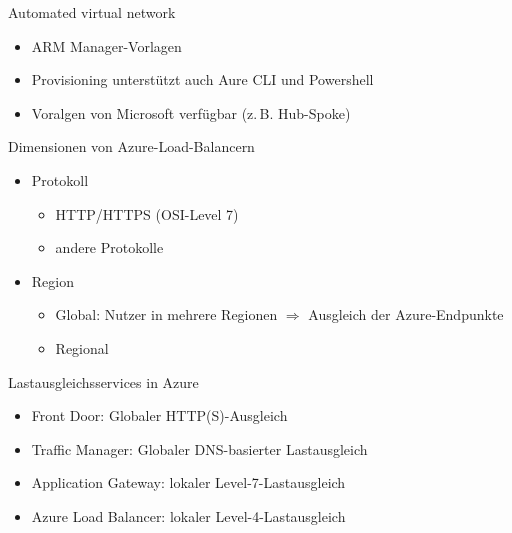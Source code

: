 
\begin{flashcard}[]{Automated virtual network}
  \begin{itemize}
    \item ARM Manager-Vorlagen
    \item Provisioning unterstützt auch Aure CLI und Powershell
    \item Voralgen von Microsoft verfügbar (z.\,B. Hub-Spoke)
  \end{itemize}
\end{flashcard}


\begin{flashcard}[]{Dimensionen von Azure-Load-Balancern}
  \begin{itemize}
    \item Protokoll
      \begin{itemize}
        \item HTTP/HTTPS (OSI-Level 7)
        \item andere Protokolle
      \end{itemize}
    \item Region
      \begin{itemize}
        \item Global: Nutzer in mehrere Regionen\newline
          $\Rightarrow$ Ausgleich der Azure-Endpunkte
        \item Regional
      \end{itemize}
  \end{itemize}
\end{flashcard}

\begin{flashcard}[]{Lastausgleichsservices in Azure}
  \begin{itemize}
    \item Front Door: Globaler HTTP(S)-Ausgleich
    \item Traffic Manager: Globaler DNS-basierter Lastausgleich
    \item Application Gateway: lokaler Level-7-Lastausgleich
    \item Azure Load Balancer: lokaler Level-4-Lastausgleich
  \end{itemize}
\end{flashcard}

